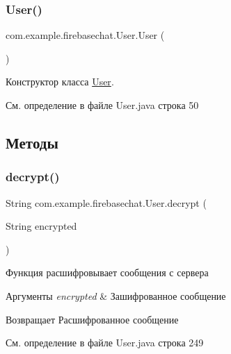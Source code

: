 \subsubsection{\texorpdfstring{User()}{User()}}
{\footnotesize\ttfamily com.\+example.\+firebasechat.\+User.\+User (\begin{DoxyParamCaption}{ }\end{DoxyParamCaption})}



Конструктор класса \mbox{\hyperlink{classcom_1_1example_1_1firebasechat_1_1_user}{User}}. 



См. определение в файле User.\+java строка 50



\subsection{Методы}
\mbox{\label{classcom_1_1example_1_1firebasechat_1_1_user_ac47b81720a3550b1856695932fec607a}} 
\subsubsection{\texorpdfstring{decrypt()}{decrypt()}}
{\footnotesize\ttfamily String com.\+example.\+firebasechat.\+User.\+decrypt (\begin{DoxyParamCaption}\item[{String}]{encrypted }\end{DoxyParamCaption})}



Функция расшифровывает сообщения с сервера 


\begin{DoxyParams}{Аргументы}
{\em encrypted} & Зашифрованное сообщение \\
\hline
\end{DoxyParams}
\begin{DoxyReturn}{Возвращает}
Расшифрованное сообщение 
\end{DoxyReturn}


См. определение в файле User.\+java строка 249

\mbox{\label{classcom_1_1example_1_1firebasechat_1_1_user_a67d1a7cbc2c9380c36a61503eb44b30f}} 
